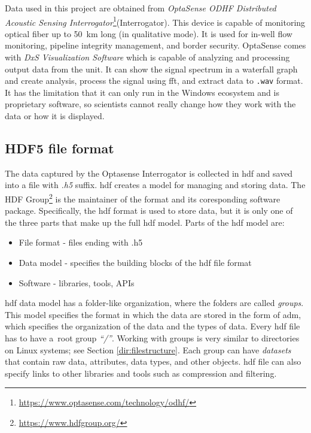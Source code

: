 Data used in this project are obtained from \textit{OptaSense ODHF Distributed Acoustic Sensing Interrogator}\footnote{\url{https://www.optasense.com/technology/odhf/}}(Interrogator). This device is capable of monitoring optical fiber up to \qty{50}{\km} long (in qualitative mode). It is used for in-well flow monitoring, pipeline integrity management, and border security. OptaSense comes with \textit{DxS Visualization Software} which is capable of analyzing and processing output data from the unit. It can show the signal spectrum in a waterfall graph and create analysis, process the signal using \ac{fft}, and extract data to \verb|.wav| format. It has the limitation that it can only run in the Windows ecosystem and is proprietary software, so scientists cannot really change how they work with the data or how it is displayed.


\subsection{HDF5 file format}\label{txt.hdf5}

The data captured by the Optasense Interrogator is collected in \ac{hdf} and saved into a file with \textit{.h5} suffix. \ac{hdf} creates a model for managing and storing data. The HDF Group\footnote{\url{https://www.hdfgroup.org/}} is the maintainer of the format and its coresponding software package. Specifically, the \ac{hdf} format is used to store data, but it is only one of the three parts that make up the full \ac{hdf} model. Parts of the \ac{hdf} model are:

\begin{itemize}
    \item File format - files ending with .h5
    \item Data model - specifies the building blocks of the \ac{hdf} file format
    \item Software - libraries, tools, APIs
\end{itemize}

\bigskip

\ac{hdf} data model has a folder-like organization, where the folders are called \textit{groups}. This model specifies the format in which the data are stored in the form of \ac{adm}, which specifies the organization of the data and the types of data. Every \ac{hdf} file has to have a~root group \textit{``/''}. Working with groups is very similar to directories on Linux systems; see Section \ref{dir:filestructure}. Each group can have \textit{datasets} that contain raw data, attributes, data types, and other objects. \ac{hdf} file can also specify links to other libraries and tools such as compression and filtering.

